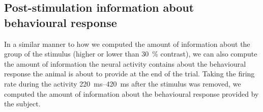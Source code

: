 \subsection{Post-stimulation information about behavioural response}

In a similar manner to how we computed the amount of information about the group of the stimulus (higher or lower than \SI{30}{\percent} contrast), we can also compute the amount of information the neural activity contains about the behavioural response the animal is about to provide at the end of the trial.
Taking the firing rate during the activity \SIrange{220}{420}{\milli\second} after the stimulus was removed, we computed the amount of information about the behavioural response provided by the subject.

%
%
